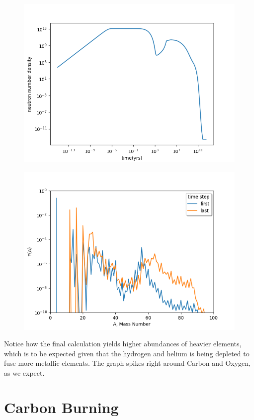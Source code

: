 \documentclass[manuscript]{aastex62}
\begin{document}
\begin{figure}
\includegraphics[scale=0.7]{neutron}
\end{figure}

\begin{figure}
\includegraphics[scale=0.7]{task3_2}
\end{figure}

Notice how the final calculation yields higher abundances of heavier elements, which is to be expected given that the hydrogen and helium is being depleted to fuse more metallic elements. The graph spikes right around Carbon and Oxygen, as we expect.

\section{Carbon Burning} \label{sec:C}
\end{document}
